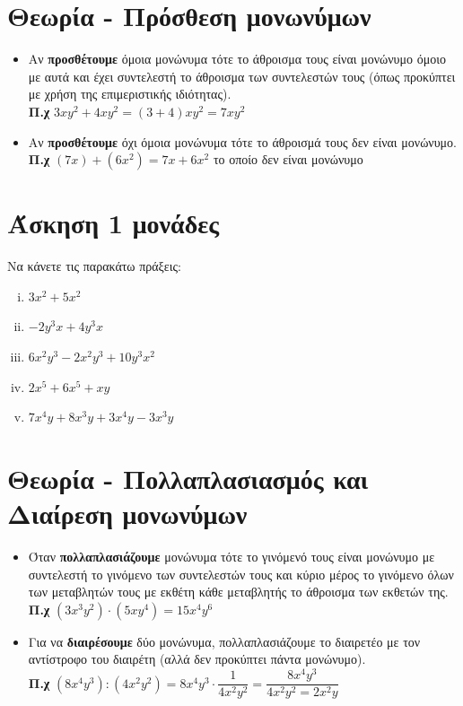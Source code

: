 \documentclass[a4paper,10pt]{report}
\begin{document}
\section*{Θεωρία - Πρόσθεση μονωνύμων \hfill \small{}}
\begin{itemize}
 \item Αν \textbf{προσθέτουμε} όμοια μονώνυμα τότε το άθροισμα τους είναι μονώνυμο όμοιο με αυτά και έχει συντελεστή 
       το άθροισμα των συντελεστών τους (όπως προκύπτει με χρήση της επιμεριστικής ιδιότητας).\\
       \textbf{Π.χ} $3xy^{2}+4xy^{2}=(3+4)xy^{2}=7xy^{2}$
 \item Αν \textbf{προσθέτουμε} όχι όμοια μονώνυμα τότε το άθροισμά τους δεν είναι μονώνυμο.\\
       \textbf{Π.χ} $(7x)+(6x^{2})=7x+6x^{2}$ το οποίο δεν είναι μονώνυμο
\end{itemize}


\section*{Άσκηση 1  \hfill \small{ μονάδες}}
Να κάνετε τις παρακάτω πράξεις:
\begin{enumerate}[i)]
 \item $3x^{2}+5x^{2}$
 \item $-2y^{3}x+4y^{3}x$
 \item $6x^{2}y^{3}-2x^{2}y^{3}+10y^{3}x^{2}$
 \item $2x^{5}+6x^{5}+xy$
 \item $7x^{4}y+8x^{3}y+3x^{4}y-3x^{3}y$
\end{enumerate}

\section*{Θεωρία - Πολλαπλασιασμός και Διαίρεση μονωνύμων \hfill \small{}}
\begin{itemize}
 \item Όταν \textbf{πολλαπλασιάζουμε} μονώνυμα τότε το γινόμενό τους είναι μονώνυμο με συντελεστή το 
       γινόμενο των συντελεστών τους και κύριο μέρος το γινόμενο όλων των μεταβλητών τους με εκθέτη 
       κάθε μεταβλητής το άθροισμα των εκθετών της.\\
       \textbf{Π.χ} $(3x^{3}y^{2})\cdot (5xy^{4}) =15x^{4}y^{6} $
 \item Για να \textbf{διαιρέσουμε} δύο μονώνυμα, πολλαπλασιάζουμε το διαιρετέο με τον αντίστροφο του 
       διαιρέτη (αλλά δεν προκύπτει πάντα μονώνυμο).\\
       \textbf{Π.χ} $ (8x^{4}y^{3}):(4x^{2}y^{2}) = 8x^{4}y^{3}\cdot \dfrac{1}{4x^{2}y^{2}}=
        \dfrac{8x^{4}y^{3}}{4x^{2}y^{2}=2x^{2}y}$
\end{itemize}
\end{document}
